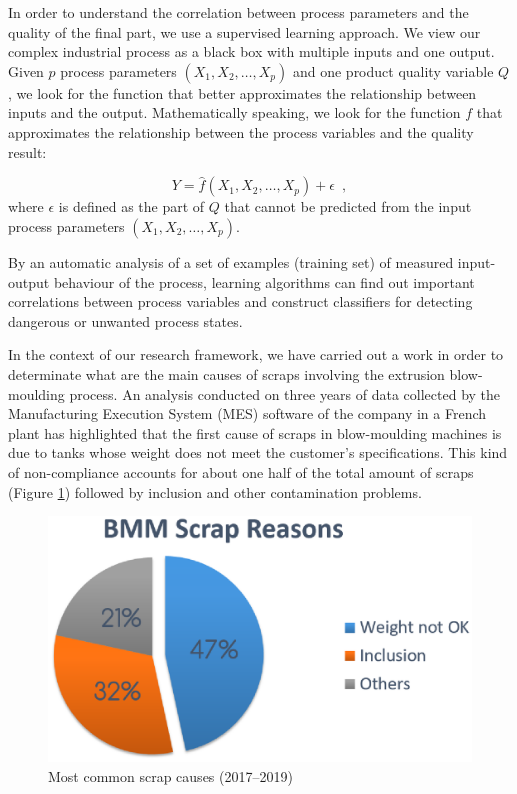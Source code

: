 In order to understand the correlation between process parameters and the quality of the final part, we use a supervised learning approach. We view our complex industrial process as a black box with multiple inputs and one output. Given $p$ process parameters $(X_1,X_2,\ldots,X_p)$ and one product quality variable $Q$, we look for the function that better approximates the relationship between inputs and the output. Mathematically speaking, we look for the function $f$ that approximates the relationship between the process variables and the quality result:

\begin{equation}
    Y = \hat{f}(X_1,X_2,\ldots,X_p) + \epsilon
    \enspace,
\end{equation}
where $\epsilon$ is defined as the part of $Q$ that cannot be predicted from the input process parameters $(X_1,X_2,\ldots,X_p)$.

By an automatic analysis of a set of examples (training set) of measured input-output behaviour of the process, learning algorithms can find out important correlations between process variables and construct classifiers for detecting dangerous or unwanted process states.

In the context of our research framework, we have carried out a work in order to determinate what are the main causes of scraps involving the extrusion blow-moulding process. An analysis conducted on three years of data collected by the Manufacturing Execution System (MES) software of the company in a French plant has highlighted that the first cause of scraps in blow-moulding machines is due to tanks whose weight does not meet the customer's specifications. This kind of non-compliance accounts for about one half of the total amount of scraps (Figure \ref{fig:Most common scrap causes (2017-2018-2019)}) followed by inclusion and other contamination problems. 

\begin{figure}
\centerline{\includegraphics[scale=0.9]{images/chapter_3/Scraps_codes.eps}}
\caption{Most common scrap causes (2017--2019)}
\label{fig:Most common scrap causes (2017-2018-2019)}
\end{figure}

